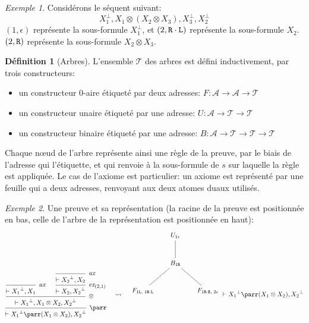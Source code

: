 \documentclass[11pt,a4paper]{article}
\theoremstyle{plain}
\theoremstyle{definition}
\newtheorem{definition}{Définition}
\theoremstyle{remark}
\newtheorem{example}{Exemple}
\newcommand*{\orth}{^\perp}
\newcommand*{\tensor}{\otimes}
\newcommand*{\axv}[1]{\infer{0}[\ensuremath{\mathit{ax}}]{\vdash #1}}
\newcommand*{\tensorv}[1]{\infer{2}[\ensuremath{\tensor}]{\vdash #1}}
\newcommand*{\parrv}[1]{\infer{1}[\ensuremath{\parr}]{\vdash #1}}
\newcommand*{\permv}[2]{\infer{1}[\ensuremath{\textit{ex}_{#1}}]{\vdash #2}}
\newcommand*{\Left}{\textnormal{\texttt{L}}}
\newcommand*{\Right}{\textnormal{\texttt{R}}}
\newcommand*{\trees}{\ensuremath{\mathcal{T}}}
\begin{document}
\begin{example}
Considérons le séquent suivant:
\begin{equation*}
X_1\orth, X_1 \tensor (X_2 \tensor X_3), X_3\orth, X_2\orth
\end{equation*}
$(1, \epsilon)$ représente la sous-formule $X_1\orth$, et $(2, \Right \cdot \Left)$ représente la sous-formule $X_2$. $(2, \Right)$ représente la sous-formule $X_2 \tensor X_3$.
\end{example}

\begin{definition}[Arbres]
\label{def_trees}
L'ensemble \trees{} des arbres est défini inductivement, par trois constructeurs:
\begin{itemize}
  \item un constructeur $0$-aire étiqueté par deux adresses: $F: \mathcal{A} \rightarrow \mathcal{A} \rightarrow \trees$
  \item un constructeur unaire étiqueté par une adresse: $U: \mathcal{A} \rightarrow \trees \rightarrow \trees$
  \item un constructeur binaire étiqueté par une adresse: $B: \mathcal{A} \rightarrow \trees \rightarrow \trees \rightarrow \trees$
\end{itemize}
\end{definition}

Chaque n\oe ud de l'arbre représente ainsi une règle de la preuve, par le biais de l'adresse qui l'étiquette, et qui renvoie à la sous-formule de $s$ sur laquelle la règle est appliquée. Le cas de l'axiome est particulier: un axiome est représenté par une feuille qui a deux adresses, renvoyant aux deux atomes duaux utilisés.

\begin{example}
Une preuve et sa représentation (la racine de la preuve est positionnée en bas, celle de l'arbre de la représentation est positionnée en haut):
\begin{equation*}
\begin{prooftree}
    \axv{{X_1}\orth, X_1}
    \axv{{X_2}\orth, X_2}
    \permv{(2, 1)}{X_2, {X_2}\orth}
    \tensorv{{X_1}\orth, X_1 \tensor X_2, {X_2}\orth}
    \parrv{{X_1}\orth \parr (X_1 \tensor X_2), {X_2}\orth}
\end{prooftree}
\quad\leadsto\quad
\begin{tikzpicture}%
    [level distance=1.5cm,
    level 2/.style={sibling distance=3.5cm}]
    \node {$U_{1 \epsilon}$}
    child {node {$B_{1 \Right}$}
        child {node {$F_{1 \Left, \; 1 \Right \cdot \Left}$}}
        child {node {$F_{1 \Right \cdot \Right, \; 2 \epsilon}$}}
    };
\end{tikzpicture}
\vdash {X_1}\orth \parr (X_1 \tensor X_2), {X_2}\orth
\end{equation*}
\end{example}
\end{document}
